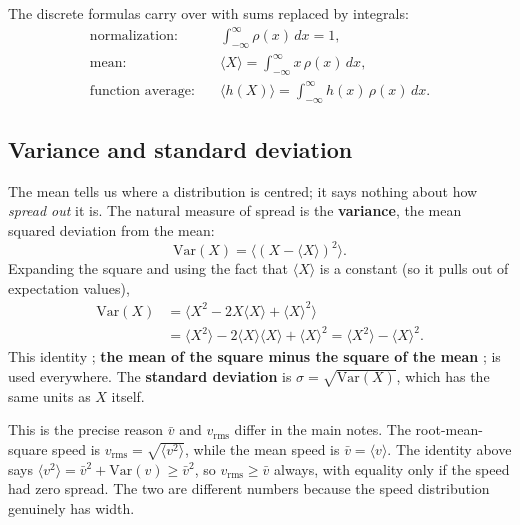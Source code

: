 \documentclass{report}
\numberwithin{equation}{section}
\begin{document}
The discrete formulas carry over with sums replaced by integrals:
\begin{align}
	\text{normalization:}\quad & \int_{-\infty}^{\infty}\rho(x)\,dx = 1,\\
	\text{mean:}\quad & \langle X\rangle = \int_{-\infty}^{\infty} x\,\rho(x)\,dx,\\
	\text{function average:}\quad & \langle h(X)\rangle = \int_{-\infty}^{\infty} h(x)\,\rho(x)\,dx.
\end{align}

\subsection{Variance and standard deviation}
The mean tells us where a distribution is centred; it says nothing about how \emph{spread out} it is. The natural measure of spread is the \textbf{variance}, the mean squared deviation from the mean:
\begin{equation}
	\mathrm{Var}(X) = \big\langle (X - \langle X\rangle)^2\big\rangle.
\end{equation}
Expanding the square and using the fact that $\langle X\rangle$ is a constant (so it pulls out of expectation values),
\begin{align*}
	\mathrm{Var}(X) &= \big\langle X^2 - 2X\langle X\rangle + \langle X\rangle^2\big\rangle\\
	&= \langle X^2\rangle - 2\langle X\rangle\langle X\rangle + \langle X\rangle^2
	= \langle X^2\rangle - \langle X\rangle^2.
\end{align*}
This identity ; \textbf{the mean of the square minus the square of the mean} ; is used everywhere. The \textbf{standard deviation} is $\sigma = \sqrt{\mathrm{Var}(X)}$, which has the same units as $X$ itself.

This is the precise reason $\bar v$ and $v_\text{rms}$ differ in the main notes. The root-mean-square speed is $v_\text{rms} = \sqrt{\langle v^2\rangle}$, while the mean speed is $\bar v = \langle v\rangle$. The identity above says $\langle v^2\rangle = \bar v^2 + \mathrm{Var}(v) \ge \bar v^2$, so $v_\text{rms}\ge\bar v$ always, with equality only if the speed had zero spread. The two are different numbers because the speed distribution genuinely has width.
\end{document}
